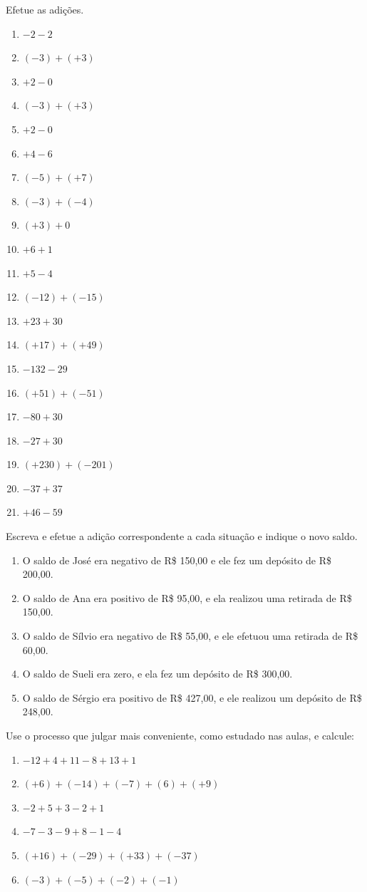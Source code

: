 		\item Efetue as adições.
		\begin{multicols}{3}
		\begin{enumerate}
			\item $-2-2$
			\item $(-3)+(+3)$
			\item $+2-0$
			\item $(-3)+(+3)$
			\item $+2-0$
			\item $+4-6$
			\item $(-5)+(+7)$
			\item $(-3)+(-4)$
			\item $(+3) +0$
			\item $+6+1$
			\item $+5-4$
			\item $(-12)+(-15)$
			\item $ +23+30$
			\item $(+17)+(+49)$
			\item $-132-29$
			\item $(+51)+(-51)$
			\item $-80+30$
			\item $-27+30$
			\item $(+230)+(-201)$
			\item $-37+37$
			\item $+46-59$
		\end{enumerate}
		\end{multicols}
		
		\item Escreva e efetue a adição correspondente a cada situação e indique o novo saldo.
		\begin{enumerate}
			\item O saldo de José era negativo de R\$ 150,00 e ele fez um depósito de R\$ 200,00.
			\item O saldo de Ana era positivo de R\$ 95,00, e ela realizou uma retirada de R\$ 150,00.
			\item O saldo de Sílvio era negativo de R\$ 55,00, e ele efetuou uma retirada de R\$ 60,00.
			\item O saldo de Sueli era zero, e ela fez um depósito de R\$ 300,00.
			\item O saldo de Sérgio era positivo de R\$ 427,00, e ele realizou um depósito de R\$ 248,00.
		\end{enumerate}
		
		\item Use o processo que julgar mais conveniente, como estudado nas aulas, e calcule:
		\begin{multicols}{2}
		\begin{enumerate}
			\item $-12+4+11-8+13 +1$
			\item $(+6)+(-14)+(-7)+(6)+(+9)$
			\item $-2+5+3-2+1$
			\item $-7-3-9+8-1-4$
			\item $(+16)+(-29)+(+33)+(-37)$
			\item $(-3)+(-5)+(-2)+(-1)$
		\end{enumerate}
		\end{multicols}
		
